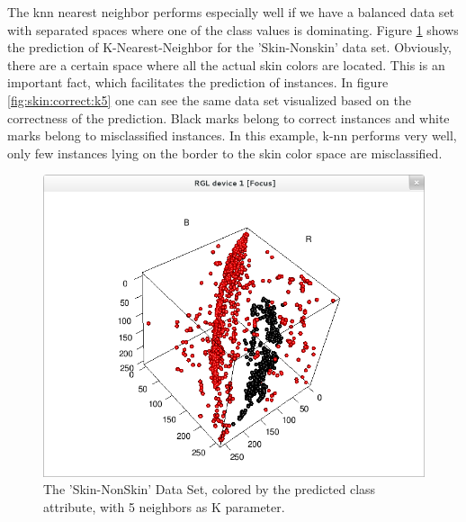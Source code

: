 \documentclass[paper=a4, fontsize=11pt]{scrartcl} %
\numberwithin{equation}{section} %
\numberwithin{figure}{section} %
\numberwithin{table}{section} %
\begin{document}
The knn nearest neighbor performs especially well if we have a balanced data set with separated spaces where one of the class values is dominating. Figure \ref{fig:skin:predicted:k5} shows the prediction of K-Nearest-Neighbor for the 'Skin-Nonskin' data set. Obviously, there are a certain space where all the actual skin colors are located. This is an important fact, which facilitates the prediction of instances. In figure \ref{fig:skin:correct:k5} one can see the same data set visualized based on the correctness of the prediction. Black marks belong to correct instances and white marks belong to misclassified instances. In this example, k-nn performs very well, only few instances lying on the border to the skin color space are misclassified.

\begin{figure}[\textwidth]
    \begin{center}
        \includegraphics[width=\textwidth]{Skin_predicted_k5}
    \end{center}
    \caption['Skin-NonSkin' prediction with k=5]{The 'Skin-NonSkin' Data Set, colored by the predicted class attribute, with 5 neighbors as K parameter.}
    \label{fig:skin:predicted:k5}
\end{figure}
\end{document}
